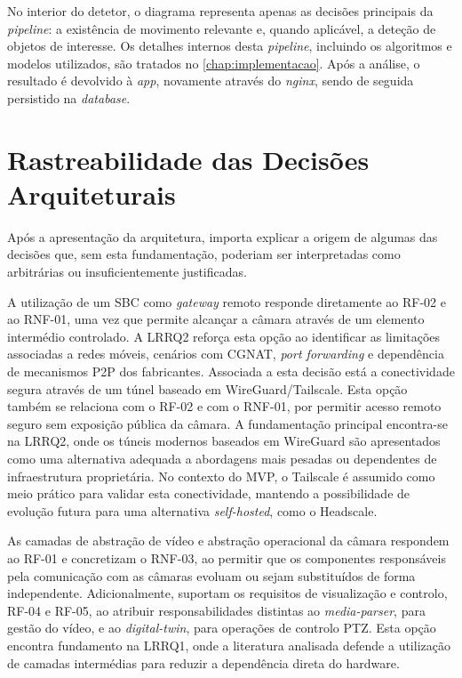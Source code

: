 No interior do detetor, o diagrama representa apenas as decisões principais da \textit{pipeline}: a existência de movimento relevante e, quando aplicável, a deteção de objetos de interesse. Os detalhes internos desta \textit{pipeline}, incluindo os algoritmos e modelos utilizados, são tratados no \autoref{chap:implementacao}. Após a análise, o resultado é devolvido à \textit{app}, novamente através do \textit{nginx}, sendo de seguida persistido na \textit{database}.

\section{Rastreabilidade das Decisões Arquiteturais}

Após a apresentação da arquitetura, importa explicar a origem de algumas das decisões que, sem esta fundamentação, poderiam ser interpretadas como arbitrárias ou insuficientemente justificadas.

A utilização de um \gls{SBC} como \textit{gateway} remoto responde diretamente ao RF-02 e ao RNF-01, uma vez que permite alcançar a câmara através de um elemento intermédio controlado. A LRRQ2 reforça esta opção ao identificar as limitações associadas a redes móveis, cenários com \gls{CGNAT}, \textit{port forwarding} e dependência de mecanismos \gls{P2P} dos fabricantes. Associada a esta decisão está a conectividade segura através de um túnel baseado em WireGuard/Tailscale. Esta opção também se relaciona com o RF-02 e com o RNF-01, por permitir acesso remoto seguro sem exposição pública da câmara. A fundamentação principal encontra-se na LRRQ2, onde os túneis modernos baseados em WireGuard são apresentados como uma alternativa adequada a abordagens mais pesadas ou dependentes de infraestrutura proprietária. No contexto do \gls{MVP}, o Tailscale é assumido como meio prático para validar esta conectividade, mantendo a possibilidade de evolução futura para uma alternativa \textit{self-hosted}, como o Headscale.

As camadas de abstração de vídeo e abstração operacional da câmara respondem ao RF-01 e concretizam o RNF-03, ao permitir que os componentes responsáveis pela comunicação com as câmaras evoluam ou sejam substituídos de forma independente. Adicionalmente, suportam os requisitos de visualização e controlo, RF-04 e RF-05, ao atribuir responsabilidades distintas ao \textit{media-parser}, para gestão do vídeo, e ao \textit{digital-twin}, para operações de controlo \gls{PTZ}. Esta opção encontra fundamento na LRRQ1, onde a literatura analisada defende a utilização de camadas intermédias para reduzir a dependência direta do hardware.

